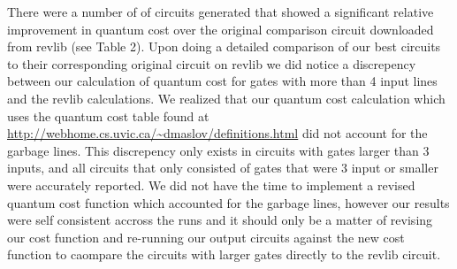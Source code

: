 There were a number of of circuits generated that showed a significant relative improvement in quantum cost over the original comparison 
circuit downloaded from revlib (see Table 2). Upon doing a detailed comparison of our best circuits to their corresponding original circuit on revlib we 
did notice a discrepency between our calculation of quantum cost for gates with more than 4 input lines and the revlib calculations. We 
realized that our quantum cost calculation which uses the quantum cost table found at \url{http://webhome.cs.uvic.ca/~dmaslov/definitions.html}
did not account for the garbage lines. This discrepency only exists in circuits with gates larger than 3 inputs, and all circuits that only consisted
of gates that were 3 input or smaller were accurately reported. We did not have the time to implement a revised quantum cost function which accounted 
for the garbage lines, however our results were self consistent accross the runs and it should only be a matter of revising our cost function and 
re-running our output circuits against the new cost function to caompare the circuits with larger gates directly to the revlib circuit.


